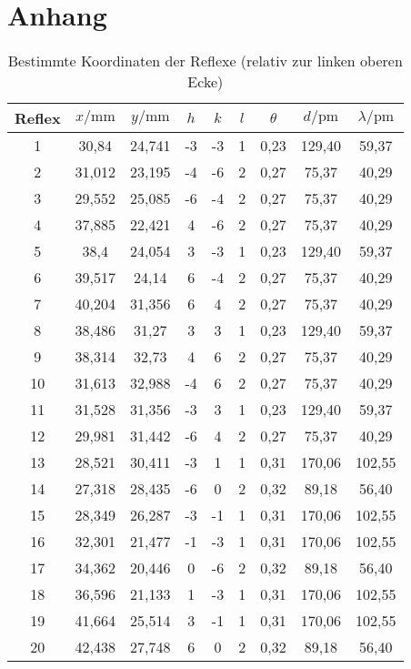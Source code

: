 \section{Anhang}

\begin{table}[h]
\centering
\caption{Bestimmte Koordinaten der Reflexe (relativ zur linken oberen Ecke)}
\label{tab:coords}
\begin{tabular}{ccccccccc}
\toprule
Reflex & $x/\si{\milli\meter}$ & $y/\si{\milli\meter}$ & $h$ & $k$ & $l$ & $\theta$ & $d/\si{\pico\meter}$ & $\lambda/\si{\pico\meter}$\\
\midrule
1 & 30,84 & 24,741 & -3 & -3 & 1 & 0,23 & 129,40 & 59,37\\
2 & 31,012 & 23,195 & -4 & -6 & 2 & 0,27 & 75,37 & 40,29\\
3 & 29,552 & 25,085 & -6 & -4 & 2 & 0,27 & 75,37 & 40,29\\
4 & 37,885 & 22,421 & 4 & -6 & 2 & 0,27 & 75,37 & 40,29\\
5 & 38,4 & 24,054 & 3 & -3 & 1 & 0,23 & 129,40 & 59,37\\
6 & 39,517 & 24,14 & 6 & -4 & 2 & 0,27 & 75,37 & 40,29\\
7 & 40,204 & 31,356 & 6 & 4 & 2 & 0,27 & 75,37 & 40,29\\
8 & 38,486 & 31,27 & 3 & 3 & 1 & 0,23 & 129,40 & 59,37\\
9 & 38,314 & 32,73 & 4 & 6 & 2 & 0,27 & 75,37 & 40,29\\
10 & 31,613 & 32,988 & -4 & 6 & 2 & 0,27 & 75,37 & 40,29\\
11 & 31,528 & 31,356 & -3 & 3 & 1 & 0,23 & 129,40 & 59,37\\
12 & 29,981 & 31,442 & -6 & 4 & 2 & 0,27 & 75,37 & 40,29\\
13 & 28,521 & 30,411 & -3 & 1 & 1 & 0,31 & 170,06 & 102,55\\
14 & 27,318 & 28,435 & -6 & 0 & 2 & 0,32 & 89,18 & 56,40\\
15 & 28,349 & 26,287 & -3 & -1 & 1 & 0,31 & 170,06 & 102,55\\
16 & 32,301 & 21,477 & -1 & -3 & 1 & 0,31 & 170,06 & 102,55\\
17 & 34,362 & 20,446 & 0 & -6 & 2 & 0,32 & 89,18 & 56,40\\
18 & 36,596 & 21,133 & 1 & -3 & 1 & 0,31 & 170,06 & 102,55\\
19 & 41,664 & 25,514 & 3 & -1 & 1 & 0,31 & 170,06 & 102,55\\
20 & 42,438 & 27,748 & 6 & 0 & 2 & 0,32 & 89,18 & 56,40\\

\end{tabular}
\end{table}
